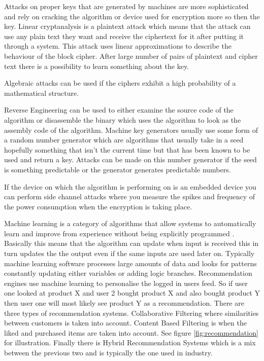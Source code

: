 Attacks on proper keys that are generated by machines are more sophisticated and rely on cracking the algorithm or device used for encryption more so then the key.
Linear cryptanalysis \cite{cipher-attacks} is a plaintext attack which means that the attack can use any plain text they want and receive the ciphertext for it after putting it through a system. This attack uses linear approximations to describe the behaviour of the block cipher. After large number of pairs of plaintext and cipher text there is a possibility to learn something about the key.

Algebraic attacks \cite{cipher-attacks} can be used if the ciphers exhibit a high probability of a mathematical structure. 

Reverse Engineering \cite{cipher-attacks} can be used to either examine the source code of the algorithm or disassemble the binary which uses the algorithm to look as the assembly code of the algorithm.
Machine key generators usually use some form of a random number generator which are algorithms that usually take in a seed hopefully something that isn't the current time but that has been known to be used and return a key. Attacks can be made on this number generator if the seed is something predictable or the generator generates predictable numbers. 

If the device on which the algorithm is performing on is an embedded device you can perform side channel attacks \cite{cipher-attacks} where you measure the spikes and frequency of the power consumption when the encryption is taking place. 

%
%
%
%

Machine learning is a category of algorithms that allow systems to automatically learn and improve from experience without being explicitly programmed \cite{machineLearning}. Basically this means that the algorithm can update when input is received this in turn updates the the output even if the same inputs are used later on.
Typically machine learning software processes large amounts of data and looks for patterns constantly updating either variables or adding logic branches. Recommendation engines use machine learning to personalise the logged in users feed. So if user one looked at product X and user 2 bought product X and also bought product Y then user one will most likely see product Y as a recommendation. There are three types of recommendation systems. Collaborative Filtering \cite{recommendation} where similarities between customers is taken into account.
Content Based Filtering \cite{recommendation} is when the liked and purchased items are taken into account. See figure \ref{fig:recommendation} for illustration.
Finally there is Hybrid Recommendation Systems which is a mix between the previous two and is typically the one used in industry.

